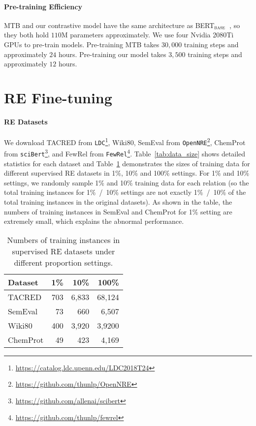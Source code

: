 \documentclass[11pt,a4paper]{article}
\begin{document}
\paragraph{Pre-training Efficiency}  MTB and our contrastive model have the same architecture as BERT$_{\small \textsc{base}}$~\citep{devlin2019bert}, so they both hold $110$M parameters approximately.
We use four Nvidia 2080Ti GPUs to pre-train models. Pre-training MTB takes $30,000$ training steps and approximately $24$ hours. Pre-training our model takes $3,500$ training steps and approximately $12$ hours. 


\section{RE Fine-tuning} 
\label{appendix:fine-tuning}

\paragraph{RE Datasets} We download TACRED from \texttt{LDC}\footnote{\url{https://catalog.ldc.upenn.edu/LDC2018T24}}, Wiki80, SemEval from \texttt{OpenNRE}\footnote{\url{https://github.com/thunlp/OpenNRE}}, ChemProt from \texttt{sciBert}\footnote{\url{https://github.com/allenai/scibert}}, and FewRel from \texttt{FewRel}\footnote{\url{https://github.com/thunlp/fewrel}}. Table~\ref{tab:data_size} shows detailed statistics for each dataset and Table~\ref{tab:data_size_different} demonstrates the sizes of training data for different supervised RE datasets in 1\%, 10\% and 100\% settings. 
For 1\% and 10\% settings, we randomly sample 1\% and 10\% training data for each relation (so the total training instances for 1\%~/~10\% settings are not exactly 1\%~/~10\% of the total training instances in the original datasets). As shown in the table, the numbers of training instances in SemEval and ChemProt for 1\% setting are extremely small, which explains the abnormal performance.




\begin{table}[t]
\small
    \centering
    \begin{tabular}{l|rrr}
        \toprule
        \textbf{Dataset} &  \textbf{1\%} & \textbf{10}\% & \textbf{100}\% \\
        \midrule 
        TACRED & 703 & 6,833& 68,124\\
        SemEval & 73 & 660& 6,507 \\
        Wiki80 & 400 & 3,920& 3,9200 \\
        ChemProt & 49 & 423& 4,169 \\
        \bottomrule
    \end{tabular}
    \caption{Numbers of training instances in supervised RE datasets under different proportion settings.}
    \label{tab:data_size_different}
\end{table}
\end{document}
